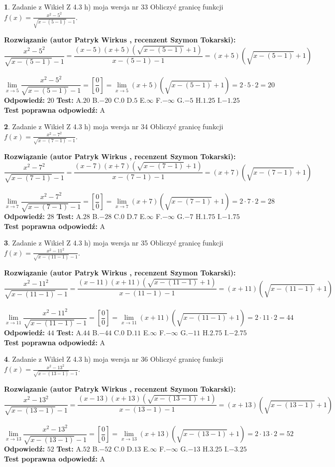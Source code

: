 \documentclass[12pt, a4paper]{article}
\theoremstyle{definition} %
\newtheorem{zad}{}
\newcommand{\zadStart}[1]{\begin{zad}#1\newline}
\newcommand{\zadStop}{\end{zad}}
\newcommand{\rozwStart}[2]{\noindent \textbf{Rozwiązanie (autor #1 , recenzent #2): }\newline}
\newcommand{\rozwStop}{\newline}
\newcommand{\odpStart}{\noindent \textbf{Odpowiedź:}\newline}
\newcommand{\odpStop}{\newline}
\newcommand{\testStart}{\noindent \textbf{Test:}\newline}
\newcommand{\testStop}{\newline}
\newcommand{\kluczStart}{\noindent \textbf{Test poprawna odpowiedź:}\newline}
\newcommand{\kluczStop}{\newline}
\begin{document}
\zadStart{Zadanie z Wikieł Z 4.3 h) moja wersja nr 33}
Obliczyć granicę funkcji $f(x)=\frac{x^{2} - 5^{2}}{\sqrt{x-(5-1)}-1}$.
\zadStop
\rozwStart{Patryk Wirkus}{Szymon Tokarski}
$$\frac{x^{2} - 5^{2}}{\sqrt{x-(5-1)}-1}=\frac{(x-5)(x+5)(\sqrt{x-(5-1)}+1)}{x-(5-1)-1}=(x+5)(\sqrt{x-(5-1)}+1)$$
\\
$$\lim\limits_{x\to 5}\frac{x^{2} - 5^{2}}{\sqrt{x-(5-1)}-1}=[\frac{0}{0}]=
\lim\limits_{x\to 5}(x+5)(\sqrt{x-(5-1)}+1) = 2\cdot5 \cdot 2 = 20$$
\rozwStop
\odpStart
$20$
\odpStop
\testStart
A.$20$
B.$-20$
C.$0$
D.$5$
E.$\infty$
F.$-\infty$
G.$-5$
H.$1.25$
I.$-1.25$
\testStop
\kluczStart
A
\kluczStop



\zadStart{Zadanie z Wikieł Z 4.3 h) moja wersja nr 34}
Obliczyć granicę funkcji $f(x)=\frac{x^{2} - 7^{2}}{\sqrt{x-(7-1)}-1}$.
\zadStop
\rozwStart{Patryk Wirkus}{Szymon Tokarski}
$$\frac{x^{2} - 7^{2}}{\sqrt{x-(7-1)}-1}=\frac{(x-7)(x+7)(\sqrt{x-(7-1)}+1)}{x-(7-1)-1}=(x+7)(\sqrt{x-(7-1)}+1)$$
\\
$$\lim\limits_{x\to 7}\frac{x^{2} - 7^{2}}{\sqrt{x-(7-1)}-1}=[\frac{0}{0}]=
\lim\limits_{x\to 7}(x+7)(\sqrt{x-(7-1)}+1) = 2\cdot7 \cdot 2 = 28$$
\rozwStop
\odpStart
$28$
\odpStop
\testStart
A.$28$
B.$-28$
C.$0$
D.$7$
E.$\infty$
F.$-\infty$
G.$-7$
H.$1.75$
I.$-1.75$
\testStop
\kluczStart
A
\kluczStop



\zadStart{Zadanie z Wikieł Z 4.3 h) moja wersja nr 35}
Obliczyć granicę funkcji $f(x)=\frac{x^{2} - 11^{2}}{\sqrt{x-(11-1)}-1}$.
\zadStop
\rozwStart{Patryk Wirkus}{Szymon Tokarski}
$$\frac{x^{2} - 11^{2}}{\sqrt{x-(11-1)}-1}=\frac{(x-11)(x+11)(\sqrt{x-(11-1)}+1)}{x-(11-1)-1}=(x+11)(\sqrt{x-(11-1)}+1)$$
\\
$$\lim\limits_{x\to 11}\frac{x^{2} - 11^{2}}{\sqrt{x-(11-1)}-1}=[\frac{0}{0}]=
\lim\limits_{x\to 11}(x+11)(\sqrt{x-(11-1)}+1) = 2\cdot11 \cdot 2 = 44$$
\rozwStop
\odpStart
$44$
\odpStop
\testStart
A.$44$
B.$-44$
C.$0$
D.$11$
E.$\infty$
F.$-\infty$
G.$-11$
H.$2.75$
I.$-2.75$
\testStop
\kluczStart
A
\kluczStop



\zadStart{Zadanie z Wikieł Z 4.3 h) moja wersja nr 36}
Obliczyć granicę funkcji $f(x)=\frac{x^{2} - 13^{2}}{\sqrt{x-(13-1)}-1}$.
\zadStop
\rozwStart{Patryk Wirkus}{Szymon Tokarski}
$$\frac{x^{2} - 13^{2}}{\sqrt{x-(13-1)}-1}=\frac{(x-13)(x+13)(\sqrt{x-(13-1)}+1)}{x-(13-1)-1}=(x+13)(\sqrt{x-(13-1)}+1)$$
\\
$$\lim\limits_{x\to 13}\frac{x^{2} - 13^{2}}{\sqrt{x-(13-1)}-1}=[\frac{0}{0}]=
\lim\limits_{x\to 13}(x+13)(\sqrt{x-(13-1)}+1) = 2\cdot13 \cdot 2 = 52$$
\rozwStop
\odpStart
$52$
\odpStop
\testStart
A.$52$
B.$-52$
C.$0$
D.$13$
E.$\infty$
F.$-\infty$
G.$-13$
H.$3.25$
I.$-3.25$
\testStop
\kluczStart
A
\kluczStop
\end{document}
